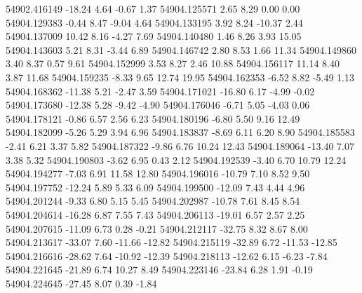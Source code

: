 54902.416149      -18.24        4.64       -0.67        1.37
54904.125571        2.65        8.29        0.00        0.00
54904.129383       -0.44        8.47       -9.04        4.64
54904.133195        3.92        8.24      -10.37        2.44
54904.137009       10.42        8.16       -4.27        7.69
54904.140480        1.46        8.26        3.93       15.05
54904.143603        5.21        8.31       -3.44        6.89
54904.146742        2.80        8.53        1.66       11.34
54904.149860        3.40        8.37        0.57        9.61
54904.152999        3.53        8.27        2.46       10.88
54904.156117       11.14        8.40        3.87       11.68
54904.159235       -8.33        9.65       12.74       19.95
54904.162353       -6.52        8.82       -5.49        1.13
54904.168362      -11.38        5.21       -2.47        3.59
54904.171021      -16.80        6.17       -4.99       -0.02
54904.173680      -12.38        5.28       -9.42       -4.90
54904.176046       -6.71        5.05       -4.03        0.06
54904.178121       -0.86        6.57        2.56        6.23
54904.180196       -6.80        5.50        9.16       12.49
54904.182099       -5.26        5.29        3.94        6.96
54904.183837       -8.69        6.11        6.20        8.90
54904.185583       -2.41        6.21        3.37        5.82
54904.187322       -9.86        6.76       10.24       12.43
54904.189064      -13.40        7.07        3.38        5.32
54904.190803       -3.62        6.95        0.43        2.12
54904.192539       -3.40        6.70       10.79       12.24
54904.194277       -7.03        6.91       11.58       12.80
54904.196016      -10.79        7.10        8.52        9.50
54904.197752      -12.24        5.89        5.33        6.09
54904.199500      -12.09        7.43        4.44        4.96
54904.201244       -9.33        6.80        5.15        5.45
54904.202987      -10.78        7.61        8.45        8.54
54904.204614      -16.28        6.87        7.55        7.43
54904.206113      -19.01        6.57        2.57        2.25
54904.207615      -11.09        6.73        0.28       -0.21
54904.212117      -32.75        8.32        8.67        8.00
54904.213617      -33.07        7.60      -11.66      -12.82
54904.215119      -32.89        6.72      -11.53      -12.85
54904.216616      -28.62        7.64      -10.92      -12.39
54904.218113      -12.62        6.15       -6.23       -7.84
54904.221645      -21.89        6.74       10.27        8.49
54904.223146      -23.84        6.28        1.91       -0.19
54904.224645      -27.45        8.07        0.39       -1.84
